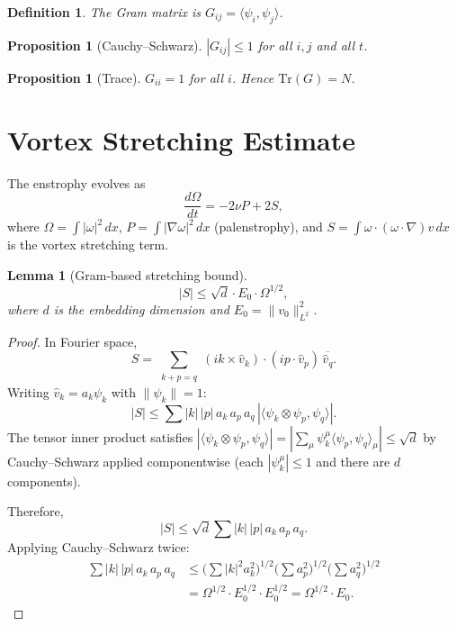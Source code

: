 \documentclass[12pt]{article}
\newtheorem{lemma}[theorem]{Lemma}
\newtheorem{proposition}[theorem]{Proposition}
\newtheorem{definition}[theorem]{Definition}
\begin{document}
\begin{definition}
The Gram matrix is $G_{ij} = \langle \psi_i, \psi_j \rangle$.
\end{definition}

\begin{proposition}[Cauchy--Schwarz]\label{prop:cs}
$|G_{ij}| \leq 1$ for all $i,j$ and all $t$.
\end{proposition}

\begin{proposition}[Trace]\label{prop:tr}
$G_{ii} = 1$ for all $i$. Hence $\mathrm{Tr}(G) = N$.
\end{proposition}

\section{Vortex Stretching Estimate}

The enstrophy evolves as
\begin{equation}\label{eq:enstr}
\frac{d\Omega}{dt} = -2\nu P + 2S,
\end{equation}
where $\Omega = \int |\omega|^2 \, dx$,
$P = \int |\nabla \omega|^2 \, dx$ (palenstrophy),
and $S = \int \omega \cdot (\omega \cdot \nabla) v \, dx$
is the vortex stretching term.

\begin{lemma}[Gram-based stretching bound]\label{lem:stretch}
\begin{equation}\label{eq:stretch}
|S| \leq \sqrt{d} \cdot E_0 \cdot \Omega^{1/2},
\end{equation}
where $d$ is the embedding dimension and
$E_0 = \|v_0\|_{L^2}^2$.
\end{lemma}

\begin{proof}
In Fourier space,
\[
S = \sum_{\substack{k+p=q}} (ik \times \hat{v}_k)
\cdot (ip \cdot \hat{v}_p) \, \overline{\hat{v}_q}.
\]
Writing $\hat{v}_k = a_k \psi_k$ with $\|\psi_k\| = 1$:
\[
|S| \leq \sum |k| \, |p| \, a_k \, a_p \, a_q
\, |\langle \psi_k \otimes \psi_p, \psi_q \rangle|.
\]
The tensor inner product satisfies
$|\langle \psi_k \otimes \psi_p, \psi_q \rangle|
= |\sum_\mu \psi_k^\mu \langle \psi_p, \psi_q \rangle_\mu|
\leq \sqrt{d}$
by Cauchy--Schwarz applied componentwise
(each $|\psi_k^\mu| \leq 1$ and there are $d$ components).

Therefore,
\[
|S| \leq \sqrt{d} \sum |k| \, |p| \, a_k \, a_p \, a_q.
\]
Applying Cauchy--Schwarz twice:
\begin{align*}
\sum |k| \, |p| \, a_k \, a_p \, a_q
&\leq \Big(\sum |k|^2 a_k^2\Big)^{1/2}
\Big(\sum a_p^2\Big)^{1/2}
\Big(\sum a_q^2\Big)^{1/2} \\
&= \Omega^{1/2} \cdot E_0^{1/2} \cdot E_0^{1/2}
= \Omega^{1/2} \cdot E_0.
\end{align*}
\end{proof}
\end{document}
